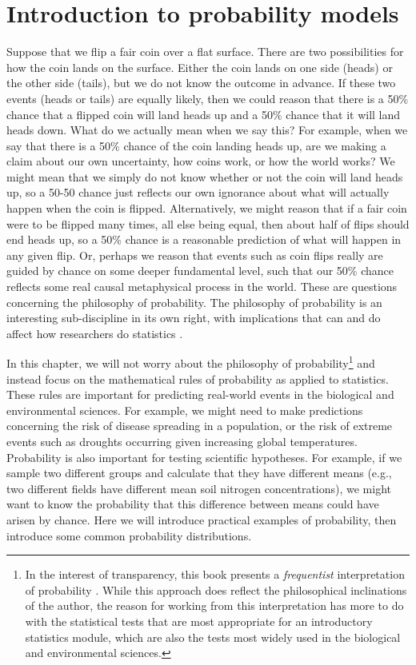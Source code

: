 \documentclass[
  openany]{krantz}
\begin{document}
\hypertarget{Chapter_15}{%
\chapter{Introduction to probability models}\label{Chapter_15}}

Suppose that we flip a fair coin over a flat surface.
There are two possibilities for how the coin lands on the surface.
Either the coin lands on one side (heads) or the other side (tails), but we do not know the outcome in advance.
If these two events (heads or tails) are equally likely, then we could reason that there is a 50\% chance that a flipped coin will land heads up and a 50\% chance that it will land heads down.
What do we actually mean when we say this?
For example, when we say that there is a 50\% chance of the coin landing heads up, are we making a claim about our own uncertainty, how coins work, or how the world works?
We might mean that we simply do not know whether or not the coin will land heads up, so a 50-50 chance just reflects our own ignorance about what will actually happen when the coin is flipped.
Alternatively, we might reason that if a fair coin were to be flipped many times, all else being equal, then about half of flips should end heads up, so a 50\% chance is a reasonable prediction of what will happen in any given flip.
Or, perhaps we reason that events such as coin flips really are guided by chance on some deeper fundamental level, such that our 50\% chance reflects some real causal metaphysical process in the world.
These are questions concerning the philosophy of probability.
The philosophy of probability is an interesting sub-discipline in its own right, with implications that can and do affect how researchers do statistics \citep{Edwards1972, Mayo1996, Gelman2013, Suarez2020, Mayo2021, Navarro2022}.

In this chapter, we will not worry about the philosophy of probability\footnote{In the interest of transparency, this book presents a \emph{frequentist} interpretation of probability \citep{Mayo1996}. While this approach does reflect the philosophical inclinations of the author, the reason for working from this interpretation has more to do with the statistical tests that are most appropriate for an introductory statistics module, which are also the tests most widely used in the biological and environmental sciences.} and instead focus on the mathematical rules of probability as applied to statistics.
These rules are important for predicting real-world events in the biological and environmental sciences.
For example, we might need to make predictions concerning the risk of disease spreading in a population, or the risk of extreme events such as droughts occurring given increasing global temperatures.
Probability is also important for testing scientific hypotheses.
For example, if we sample two different groups and calculate that they have different means (e.g., two different fields have different mean soil nitrogen concentrations), we might want to know the probability that this difference between means could have arisen by chance.
Here we will introduce practical examples of probability, then introduce some common probability distributions.
\end{document}
